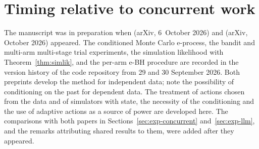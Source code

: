 \documentclass[12pt]{article}
\theoremstyle{remark}
\begin{document}
\section{Timing relative to concurrent work}\label{app:timeline}

The manuscript was in preparation when \citet{forre2026anytime} (arXiv,
6~October 2026) and \citet{cortinovis2026slice} (arXiv, October 2026)
appeared. The conditioned Monte Carlo e-process, the bandit and multi-arm
multi-stage trial experiments, the simulation likelihood with
Theorem~\ref{thm:simlik}, and the per-arm e-BH procedure are recorded in the
version history of the code repository from 29 and 30 September 2026. Both
preprints develop the method for independent data;
\citet[Appendix~C.1.1]{cortinovis2026slice} note the possibility of
conditioning on the past for dependent data. The treatment of actions chosen
from the data and of simulators with state, the necessity of the conditioning
and the use of adaptive actions as a source of power are developed here. The comparisons with both papers in
Sections~\ref{sec:exp-concurrent} and~\ref{sec:exp-llm}, and the remarks
attributing shared results to them, were added after they appeared.
\end{document}
